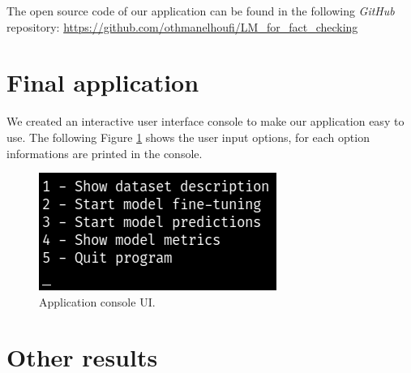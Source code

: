 \documentclass[conference]{IEEEtran}
\begin{document}
\begin{appendices}
The open source code of our application can be found in the following \textit{GitHub} repository: \url{https://github.com/othmanelhoufi/LM_for_fact_checking}

\section{Final application}
We created an interactive user interface console to make our application easy to use. The following Figure \ref{fig:app_options} shows the user input options, for each option informations are printed in the console.

\begin{figure}[htp]
    \centering
    \includegraphics[scale=0.6]{app_options.png}
    \caption[Comparison]{Application console UI.}
    \label{fig:app_options}
\end{figure}

\newpage
\section{Other results}


\end{appendices}
\end{document}
